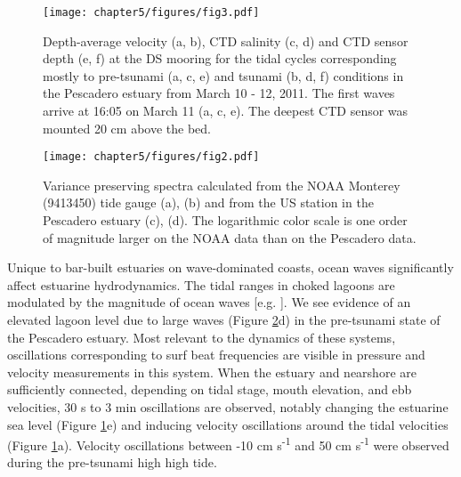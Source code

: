 
\begin{figure}
\texttt{[image: chapter5/figures/fig3.pdf]}

\protect\caption{Depth-average velocity (a, b), CTD salinity (c, d) and CTD sensor
depth (e, f) at the DS mooring for the tidal cycles corresponding
mostly to pre-tsunami (a, c, e) and tsunami (b, d, f) conditions in
the Pescadero estuary from March 10 - 12, 2011. The first waves arrive
at 16:05 on March 11 (a, c, e). The deepest CTD sensor was mounted
20 cm above the bed. \label{fig:Station-DS-CTD_stack}}
\end{figure}



\begin{figure}
\centering
\textsf{\texttt{[image: chapter5/figures/fig2.pdf]}}

\protect\caption{Variance preserving spectra calculated from the NOAA Monterey (9413450)
tide gauge (a), (b) and from the US station in the Pescadero estuary
(c), (d).  The logarithmic color scale is one order of magnitude larger
on the NOAA data than on the Pescadero data.\label{fig:Pescadero-stacked-variance_presreving_spectra}}
\end{figure}

Unique to bar-built estuaries on wave-dominated coasts, ocean waves
significantly affect estuarine hydrodynamics. The tidal ranges in
choked lagoons are modulated by the magnitude of ocean waves {[}e.g.
\cite{malhadas_effect_2009}{]}. We see evidence of an elevated
lagoon level due to large waves (Figure \ref{fig:Pescadero-stacked-variance_presreving_spectra}d)
in the pre-tsunami state of the Pescadero estuary. Most relevant to
the dynamics of these systems, oscillations corresponding to surf
beat frequencies are visible in pressure and velocity measurements
in this system. When the estuary and nearshore are sufficiently connected,
depending on tidal stage, mouth elevation, and ebb velocities, 30
s to 3 min oscillations are observed, notably changing the estuarine
sea level (Figure \ref{fig:Station-DS-CTD_stack}e) and inducing velocity
oscillations around the tidal velocities (Figure \ref{fig:Station-DS-CTD_stack}a).
Velocity oscillations between -10 cm s\textsuperscript{-1} and 50
cm s\textsuperscript{-1} were observed during the pre-tsunami high
high tide. 

